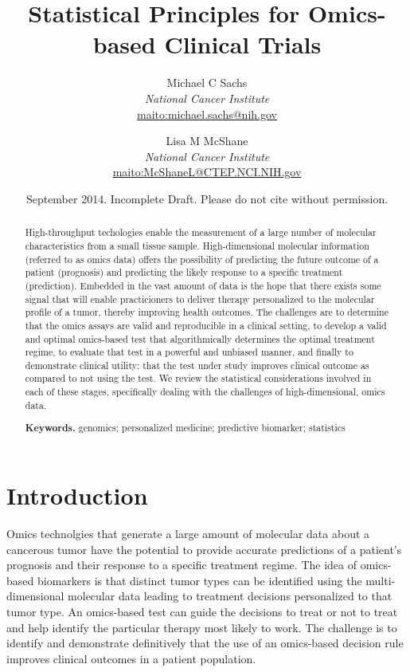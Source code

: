 \documentclass[11pt]{article}
\title{\bigskip \bigskip Statistical Principles for Omics-based Clinical Trials}
\author{\Large Michael C Sachs\vspace{0.05in} \\ \normalsize\emph{National Cancer Institute} \\ \footnotesize \url{maito:michael.sachs@nih.gov}\vspace*{0.2in}\\  \and \Large Lisa M McShane\vspace{0.05in} \\ \normalsize\emph{National Cancer Institute} \\ \footnotesize \url{maito:McShaneL@CTEP.NCI.NIH.gov}\vspace*{0.2in}\\ }
\date{\footnotesize September 2014. Incomplete Draft. Please do not cite without permission.}
\begin{document}
  
		




\maketitle


\begin{abstract}

\noindent High-throughput techologies enable the measurement of a large number of
molecular characteristics from a small tissue sample. High-dimensional
molecular information (referred to as omics data) offers the possibility
of predicting the future outcome of a patient (prognosis) and predicting
the likely response to a specific treatment (prediction). Embedded in
the vast amount of data is the hope that there exists some signal that
will enable practicioners to deliver therapy personalized to the
molecular profile of a tumor, thereby improving health outcomes. The
challenges are to determine that the omics assays are valid and
reproducible in a clinical setting, to develop a valid and optimal
omics-based test that algorithmically determines the optimal treatment
regime, to evaluate that test in a powerful and unbiased manner, and
finally to demonstrate clinical utility: that the test under study
improves clinical outcome as compared to not using the test. We review
the statistical considerations involved in each of these stages,
specifically dealing with the challenges of high-dimensional, omics
data.

\smallskip
\noindent \textbf{Keywords.} genomics; personalized medicine; predictive biomarker; statistics

\end{abstract}


\section{Introduction}\label{introduction}

Omics technolgies that generate a large amount of molecular data about a
cancerous tumor have the potential to provide accurate predictions of a
patient's prognosis and their response to a specific treatment regime.
The idea of omics-based biomarkers is that distinct tumor types can be
identified using the multi-dimensional molecular data leading to
treatment decisions personalized to that tumor type. An omics-based test
can guide the decisions to treat or not to treat and help identify the
particular therapy most likely to work. The challenge is to identify and
demonstrate definitively that the use of an omics-based decision rule
improves clinical outcomes in a patient population.
\end{document}
